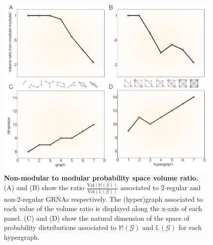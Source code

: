 \begin{figure}[!ht]
\centering
\noindent\includegraphics[width=0.9\columnwidth]{fig/figure_graphs_dims_nolines.pdf}
\caption{{\bf Non-modular to modular probability space volume ratio.} (A) and (B) show the ratio $\frac{\text{Vol}(\mathbb{M}(\mathcal{G}))}{\text{Vol}(\mathbb{L}(\mathcal{G}))}$ associated to 2-regular and non-2-regular GRNAs respectively. The (hyper)graph associated to each value of the volume ratio is displayed along the x-axis of each panel. (C) and (D) show the natural dimension of the space of probability distributions associated to $\mathbb{M}(\mathcal{G})$ and $\mathbb{L}(\mathcal{G})$ for each hypergraph.}
\label{fig:ncycvolrat}
\end{figure}

